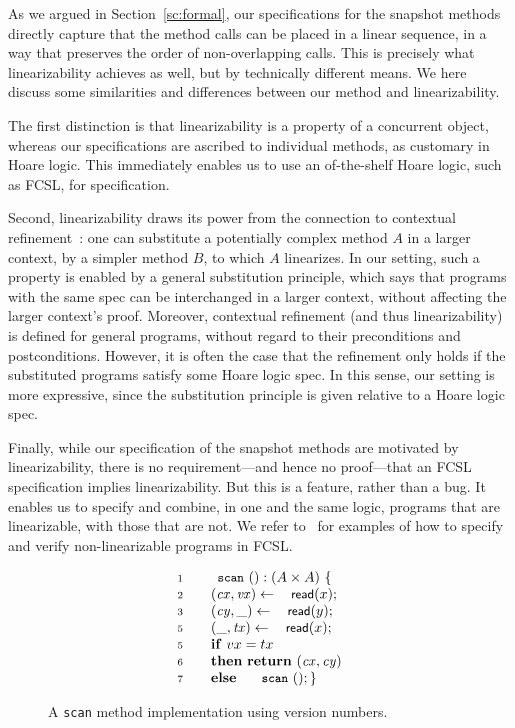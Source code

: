 \documentclass[a4paper,UKenglish]{lipics-v2016}
\newcommand{\asgn}{\leftarrow}
\newcommand{\act}[1]{\textsf{\small{#1}}}
\newcommand{\esc}[1]{\text{\texttt{\small{#1}}}}
\newcommand{\kw}[1]{\text{\textbf{#1}}}
\newcommand{\var}[1]{\mathit{#1}}
\newcommand{\num}[1]{{\text{{\scriptsize{#1}}}}}
\def\tbnd{\asgn}
\theoremstyle{definition}
\begin{document}
As we argued in Section~\ref{sc:formal}, our specifications for the
snapshot methods directly capture that the method calls can be placed
in a linear sequence, in a way that preserves the order of
non-overlapping calls. This is precisely what linearizability achieves
as well, but by technically different means. We here discuss some
similarities and differences between our method and linearizability.

The first distinction is that linearizability is a property of a
concurrent object, whereas our specifications are ascribed to
individual methods, as customary in Hoare logic. This immediately
enables us to use an of-the-shelf Hoare logic, such as FCSL, for
specification. 

Second, linearizability draws its power from the connection to
contextual refinement~\cite{FilipovicOHRW+TCS10}: one can substitute a
potentially complex method $A$ in a larger context, by a simpler
method $B$, to which $A$ linearizes. In our setting, such a property
is enabled by a general substitution principle, which says that
programs with the same spec can be interchanged in a larger context,
without affecting the larger context's proof. Moreover, contextual
refinement (and thus linearizability) is defined for general programs,
without regard to their preconditions and postconditions. However, it
is often the case that the refinement only holds if the substituted
programs satisfy some Hoare logic spec. In this sense, our setting is
more expressive, since the substitution principle is given relative to
a Hoare logic spec.

Finally, while our specification of the snapshot methods are motivated
by linearizability, there is no requirement---and hence no
proof---that an FCSL specification implies linearizability. But this
is a feature, rather than a bug. It enables us to specify and combine,
in one and the same logic, programs that are linearizable, with those
that are not. We refer to~\cite{SergeyNBD+OOPSLA16} for examples of
how to specify and verify non-linearizable programs in FCSL.

\begin{figure}
\centering  
\[\hfill
\begin{array}{rl}
\num{1} & \esc{scan}\ () : ( A \times A )~ \{ \\ 
\num{2} & ~~~ (\var{cx}, \var{vx}) \tbnd \act{read}(\x);\\
\num{3} & ~~~ (\var{cy}, \_ ) \tbnd \act{read}(\y);\\
\num{5} & ~~~ (\_ , \var{tx}) \tbnd \act{read}(\x);\\
\num{5} & ~~~ \kw{if}\ vx = tx \\
\num{6} & ~~~ \kw{then}\ \kw{return}\ (\var{cx},\var{cy})\\
\num{7} & ~~~ \kw{else}\ \esc{scan}\ (); \}
\end{array}\hfill
\]
\caption{A {\tt scan} method implementation using version numbers.}
\label{fig:readpair}
\end{figure}
\end{document}
